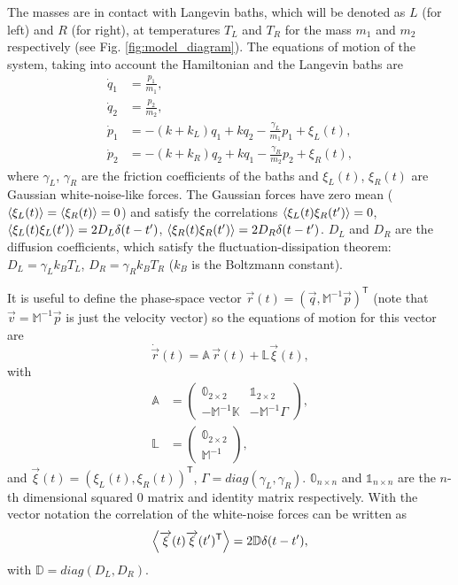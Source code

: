 The  masses are in contact with Langevin baths, which will be denoted as $L$ (for left) and $R$ (for right), at temperatures $T_{L}$ and $T_R$ for  the mass $m_1$ and $m_2$ respectively (see Fig. \ref{fig:model_diagram}). The equations of motion of the system, taking into account the Hamiltonian and the Langevin baths are
%
\begin{align}
  \dot{q}_1 &= \frac{p_1}{m_1},\nonumber
  \\
  \dot{q}_2 &= \frac{p_2}{m_2},\nonumber
  \\
  \dot{p}_1 &= -(k+k_L)q_1 + k q_2 -\frac{\gamma_L}{m_1} p_1 + \xi_L(t),\nonumber
  \\
  \dot{p}_2 &= -(k+k_R)q_2 + k q_1 -\frac{\gamma_R}{m_2} p_2 + \xi_R(t),
\end{align}
%
where $\gamma_L$, $\gamma_R$ are the friction coefficients of the baths and $\xi_L(t)$, $\xi_R(t)$ are Gaussian white-noise-like forces. The Gaussian forces have zero mean ($\expval{ \xi_L(t) } = \expval{ \xi_R(t) } = 0 $) and satisfy the correlations $\expval{ \xi_L(t)\xi_R(t') } = 0$, $\expval{ \xi_L(t)\xi_L(t') } = 2D_L\delta(t-t')$, $\expval{ \xi_R(t)\xi_R(t') } = 2D_R\delta(t-t')$. $D_L$ and $D_R$ are the diffusion coefficients, which satisfy the fluctuation-dissipation theorem: $D_L = \gamma_L k_B T_L$, $D_R =\gamma_R k_B T_R$ ($k_B$ is the Boltzmann constant).

It is useful to define the phase-space vector $\overrightarrow{r}(t) = \left( \overrightarrow{q}, \mathbb{M}^{-1}\overrightarrow{p} \right)^\mathsf{T}$ (note that $\overrightarrow{v} = \mathbb{M}^{-1}\overrightarrow{p}$ is just the velocity vector) so the equations of motion for this vector are
%
\begin{equation}
  \dot{\overrightarrow{r}}(t) = \mathbb{A} \, \overrightarrow{r}(t) + \mathbb{L}\overrightarrow{\xi}(t),
  \label{eq:vectorEqOfMotion}
\end{equation}
%
with
%
\begin{align}
  \mathbb{A} &=
  \left(
  \begin{array}{cc}
    \mathbb{0}_{2 \times 2} & \mathbb{1}_{2 \times 2}
    \\
    -\mathbb{M}^{-1}\mathbb{K} & -\mathbb{M}^{-1}\Gamma
  \end{array}
  \right),
  \nonumber
  \\
  \mathbb{L} &=
  \left(
  \begin{array}{c}
    \mathbb{0}_{2\times 2} \\ \mathbb{M}^{-1}
  \end{array}
  \right),
\end{align}
%
and $\overrightarrow{\xi}(t) = \left( \xi_L(t),\xi_R(t) \right)^\mathsf{T}$, $\Gamma = diag(\gamma_L,\gamma_R)$. $\mathbb{0}_{n\times n}$ and $\mathbb{1}_{n\times n}$ are the $n$-th dimensional squared 0 matrix and identity matrix respectively. With the vector notation the correlation of the white-noise forces can be written as
%
\begin{equation}
  \expval{\overrightarrow{\xi}(t)\overrightarrow{\xi}(t')^\mathsf{T}} = 2 \mathbb{D}\delta(t-t'),
\end{equation}
%
with $\mathbb{D} = diag(D_L,D_R)$.
%
%
%
%
%
%
